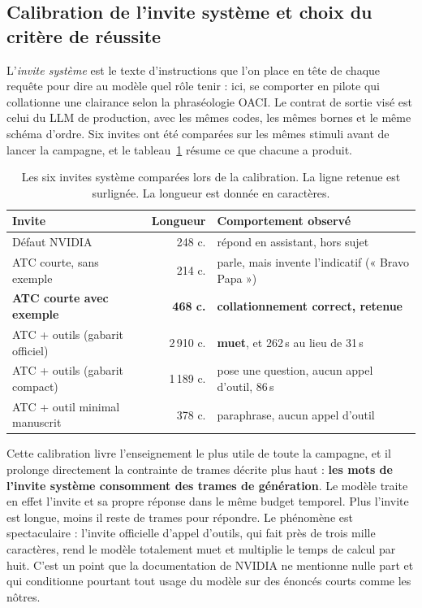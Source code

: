 \documentclass[11pt,a4paper]{article}
\begin{document}
\subsection{Calibration de l'invite système et choix du critère de réussite}

L'\emph{invite système} est le texte d'instructions que l'on place en tête de
chaque requête pour dire au modèle quel rôle tenir : ici, se comporter en pilote
qui collationne une clairance selon la phraséologie OACI. Le contrat de sortie
visé est celui du LLM de production, avec les mêmes codes, les mêmes bornes et
le même schéma d'ordre. Six invites ont été comparées sur les mêmes stimuli avant
de lancer la campagne, et le tableau~\ref{tab:invites} résume ce que chacune a
produit.

\begin{table}[h]
\centering
\caption{Les six invites système comparées lors de la calibration. La ligne
retenue est surlignée. La longueur est donnée en caractères.}
\label{tab:invites}
\small
\begin{tabular}{@{}lrl@{}}
\toprule
\textbf{Invite} & \textbf{Longueur} & \textbf{Comportement observé}\\
\midrule
Défaut NVIDIA & 248 c. & répond en assistant, hors sujet\\
ATC courte, sans exemple & 214 c. & parle, mais invente l'indicatif (« Bravo Papa »)\\
\rowcolor{atcgreen!10}
\textbf{ATC courte avec exemple} & \textbf{468 c.} & \textbf{collationnement correct, retenue}\\
ATC + outils (gabarit officiel) & 2\,910 c. & \textbf{muet}, et 262\,s au lieu de 31\,s\\
ATC + outils (gabarit compact) & 1\,189 c. & pose une question, aucun appel d'outil, 86\,s\\
ATC + outil minimal manuscrit & 378 c. & paraphrase, aucun appel d'outil\\
\bottomrule
\end{tabular}
\end{table}

Cette calibration livre l'enseignement le plus utile de toute la campagne, et il
prolonge directement la contrainte de trames décrite plus haut : \textbf{les
mots de l'invite système consomment des trames de génération}. Le modèle traite
en effet l'invite et sa propre réponse dans le même budget temporel. Plus
l'invite est longue, moins il reste de trames pour répondre. Le phénomène est
spectaculaire : l'invite officielle d'appel d'outils, qui fait près de trois
mille caractères, rend le modèle totalement muet et multiplie le temps de calcul
par huit. C'est un point que la documentation de NVIDIA ne mentionne nulle part
et qui conditionne pourtant tout usage du modèle sur des énoncés courts comme
les nôtres.
\end{document}
